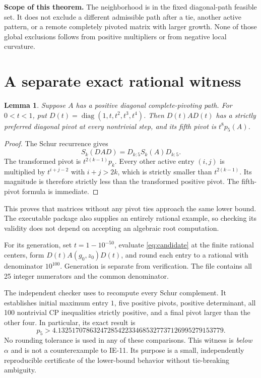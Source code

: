 \documentclass[11pt,letterpaper]{article}
\newtheorem{lemma}[theorem]{Lemma}
\newcommand{\code}[1]{\texttt{\detokenize{#1}}}
\begin{document}
\textbf{Scope of this theorem.} The neighborhood is in the fixed diagonal-path feasible set. It does not exclude a different admissible path after a tie, another active pattern, or a remote completely pivoted matrix with larger growth. None of those global exclusions follows from positive multipliers or from negative local curvature.

\section{A separate exact rational witness}\label{sec:rational}
\begin{lemma}\label{lem:strict}
Suppose $A$ has a positive diagonal complete-pivoting path. For $0<t<1$, put $D(t)=\operatorname{diag}(1,t,t^2,t^3,t^4)$. Then $D(t)AD(t)$ has a strictly preferred diagonal pivot at every nontrivial step, and its fifth pivot is $t^8p_5(A)$.
\end{lemma}
\begin{proof}
The Schur recurrence gives
\[
 S_k(DAD)=D_{k:5}S_k(A)D_{k:5}.
\]
The transformed pivot is $t^{2(k-1)}p_k$. Every other active entry $(i,j)$ is multiplied by $t^{i+j-2}$ with $i+j>2k$, which is strictly smaller than $t^{2(k-1)}$. Its magnitude is therefore strictly less than the transformed positive pivot. The fifth-pivot formula is immediate.
\end{proof}
This proves that matrices without any pivot ties approach the same lower bound. The executable package also supplies an entirely rational example, so checking its validity does not depend on accepting an algebraic root computation.

For its generation, set $t=1-10^{-50}$, evaluate \eqref{eq:candidate} at the finite rational centers, form $D(t)A(g_0,z_0)D(t)$, and round each entry to a rational with denominator $10^{100}$. Generation is separate from verification. The file \code{data/rational_witness.json} contains all 25 integer numerators and the common denominator.

The independent checker uses \code{fractions.Fraction} to recompute every Schur complement. It establishes initial maximum entry $1$, five positive pivots, positive determinant, all 100 nontrivial CP inequalities strictly positive, and a final pivot larger than the other four. In particular, its exact result is
\begin{equation}\label{eq:ratlower}
 p_5>
 4.13251707863247285422334685327737126995279153779.
\end{equation}
No rounding tolerance is used in any of these comparisons. This witness is \emph{below} $\alpha$ and is not a counterexample to IE-11. Its purpose is a small, independently reproducible certificate of the lower-bound behavior without tie-breaking ambiguity.
\end{document}
